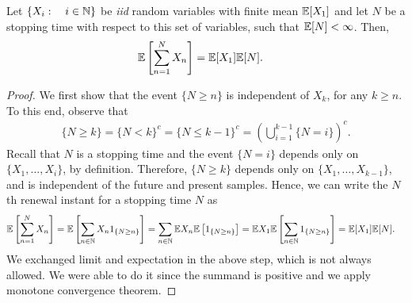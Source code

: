 \documentclass[a4paper,10pt,english]{article}
\begin{document}
\begin{lem}
Let $\{X_i:\quad i\in \mathbb{N}\}$ be \textit{iid} random variables with finite mean $\mathbb{E}[X_1]$ and let $N$ be a stopping time with respect to this set of variables, such that $\mathbb{E}[N] < \infty$. 
Then,
\begin{align*}
\mathbb{E}\left[\sum_{n=1}^N X_n\right] &= \mathbb{E}[X_1]\mathbb{E}[N].
\end{align*}
\end{lem}
\begin{proof} 
We first show that the event $\{N \geq n\}$ is independent of $X_k$, for any $k \geq n$. 
To this end, observe that 
\begin{align*}
\{N \geq k\} = \{N < k\}^c = \{N \leq k-1\}^c = \left(\bigcup_{i=1}^{k-1} \{N = i\}\right)^c. 
\end{align*}
Recall that $N$ is a stopping time and the event $\{N=i\}$ depends only on $\{X_1,\ldots, X_i\}$, by definition.  
Therefore, $\{N \geq k\}$ depends only on $\{X_1,\ldots, X_{k-1}\}$, and is independent of the future and present samples. 
Hence, we can write the $N$th renewal instant for a stopping time $N$ as 
\begin{align*}
\mathbb{E}\left[\sum_{n=1}^N X_n\right] &= \mathbb{E}\left[\sum_{n \in \mathbb{N}} X_n 1_{\{N \geq n\}}\right] = \sum_{n \in \mathbb{N}} \mathbb{E} X_n \mathbb{E}\left[1_{\{N \geq n\}}\right] = \mathbb{E} X_1\mathbb{E}\left[ \sum_{n \in \mathbb{N}} 1_{\{N \geq n\}}\right] = \mathbb{E}[X_1]\mathbb{E}[N].
\end{align*}
We exchanged limit and expectation in the above step, which is not always allowed. 
We were able to do it since the summand is positive and we apply monotone convergence theorem. 
\end{proof}
\end{document}
